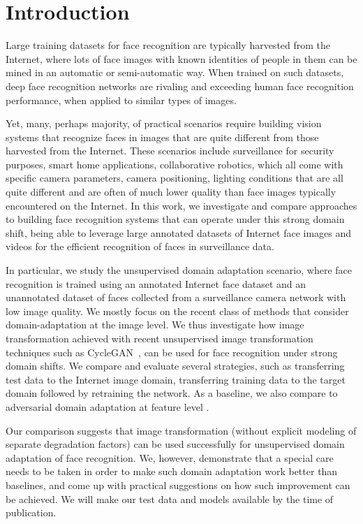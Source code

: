 \section{Introduction}
\label{sect:intro}

Large training datasets for face recognition are typically harvested from the Internet, where lots of face images with known identities of people in them can be mined in an automatic or semi-automatic way. When trained on such datasets, deep face recognition networks are rivaling and exceeding human face recognition performance, when applied to similar types of images. 

Yet, many, perhaps majority, of practical scenarios require building vision systems that recognize faces in images that are quite different from those harvested from the Internet. These scenarios include surveillance for security purposes, smart home applications, collaborative robotics, which all come with specific camera parameters, camera positioning, lighting conditions that are all quite different and are often of much lower quality than face images typically encountered on the Internet. In this work, we investigate and compare approaches to building face recognition systems that can operate under this strong domain shift, being able to leverage large annotated datasets of Internet face images and videos for the efficient recognition of faces in surveillance data. 

In particular, we study the unsupervised domain adaptation scenario, where face recognition is trained using an annotated Internet face dataset and an unannotated dataset of faces collected from a surveillance camera network with low image quality. We mostly focus on the recent class of methods that consider domain-adaptation at the image level. We thus investigate how image transformation achieved with recent unsupervised image transformation techniques such as CycleGAN~\cite{ZhuPIE17}, can be used for face recognition under strong domain shifts. We compare and evaluate several strategies, such as transferring test data to the Internet image domain,  transferring training data to the target domain followed by retraining the network. As a baseline, we also compare to adversarial domain adaptation at feature level \cite{GaninUAGLLML16}. 

Our comparison suggests that image transformation (without explicit modeling of separate degradation factors) can be used successfully for unsupervised domain adaptation of face recognition. We, however, demonstrate that a special care needs to be taken in order to make such domain adaptation work better than baselines, and come up with practical suggestions on how such improvement can be achieved. We will make our test data and models available by the time of publication.


